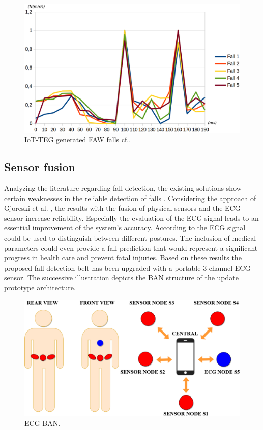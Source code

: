 \documentclass[10pt,journal,compsoc]{IEEEtran}
\begin{document}
\begin{figure}[!ht]
	\centering
	\includegraphics[scale=0.22]{Images/IoTTEGFAWGeneratedEvents.eps}
	\caption[IoT-TEG generated FAW falls]{IoT-TEG generated FAW falls cf.\cite{LorenaFall}.}
	\label{fig:IoTTEGFAWGeneratedEvents}
\end{figure}

\subsection{Sensor fusion}
\label{subsec:sensorfusion}	
Analyzing the literature regarding fall detection, the existing solutions show certain weaknesses in the reliable detection of falls \cite{Igual2013, Li2009, Luder2009, Pannurat2014, jamsa2014fall}. Considering the approach of Gjoreski et al. \cite{Gjoreski2014}, the results with the fusion of physical sensors and the ECG sensor increase reliability. Especially the evaluation of the ECG signal leads to an essential improvement of the system's accuracy.  According to \cite{Gjoreski2014} the ECG signal could be used to distinguish between different postures. The inclusion of medical parameters could even provide a fall prediction that would represent a significant progress in health care and prevent fatal injuries. Based on these results the proposed fall detection belt has been upgraded with a portable 3-channel ECG sensor. The successive illustration depicts the BAN structure of the update prototype architecture.
\begin{figure}[!ht]
	\centering
	\includegraphics[scale=0.26]{Images/ECG-BAN.eps}
	\caption[ECG BAN]{ECG BAN.}
	\label{fig:ECGBAN}
\end{figure}
\end{document}
